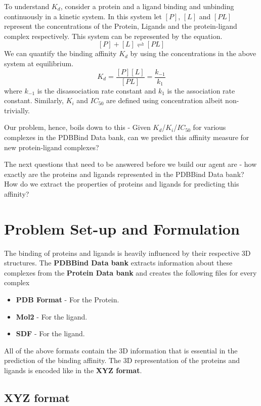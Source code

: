 \documentclass[11pt]{article}
\begin{document}
To understand $K_d$, consider a protein and a ligand binding and unbinding continuously in a kinetic system.
In this system let $[P]$, $[L]$ and $[PL]$ represent the concentrations of the Protein, Ligands 
and the protein-ligand complex respectively.
This system can be represented by the equation.
$$[P] + [L] \rightleftharpoons [PL]$$
We can quantify the binding affinity $K_d$ by using the concentrations in the above system at equilibrium.
$$K_d = \frac{[P][L]}{[PL]} = \frac{k_{-1}}{k_1}$$
where $k_{-1}$ is the disassociation rate constant and $k_1$ is the association rate constant.
Similarly, $K_i$ and $IC_{50}$ are defined using concentration albeit non-trivially. 
\cite{binding_affinity_description}

Our problem, hence, boils down to this - Given $K_d$/$K_i$/$IC_{50}$ for various complexes in the PDBBind Data bank,
can we predict this affinity measure for new protein-ligand complexes?

The next questions that need to be answered before we build our agent are - how exactly are the proteins and ligands represented in the PDBBind Data bank?
How do we extract the properties of proteins and ligands for predicting this affinity?

\section{Problem Set-up and Formulation}

The binding of proteins and ligands is heavily influenced by their respective 3D structures.
The \textbf{PDBBind Data bank} extracts information about these complexes from the \textbf{Protein Data bank} and creates the following files for every complex
\begin{itemize}
\item \textbf{PDB Format} - For the Protein.
\item  \textbf{Mol2} - For the ligand.
\item \textbf{SDF} - For the ligand.
\end{itemize}

All of the above formats contain the 3D information that is essential in the prediction of the binding affinity.
The 3D representation of the proteins and ligands is encoded like in the \textbf{XYZ format}.

\subsection{XYZ format}
\end{document}
